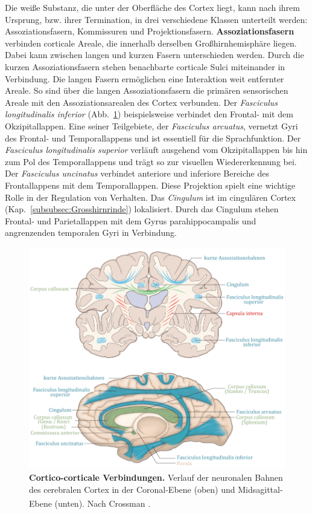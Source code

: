 \documentclass[12pt,a4paper,pdftex]{article}
\begin{document}
Die weiße Substanz, die unter der Oberfläche des Cortex liegt, kann nach ihrem Ursprung, bzw. ihrer Termination, in drei verschiedene Klassen unterteilt werden: Assoziationsfasern, Kommissuren und Projektionsfasern.
\textbf{Assoziationsfasern} verbinden corticale Areale, die innerhalb derselben Großhirnhemisphäre liegen. Dabei kann zwischen langen und kurzen Fasern unterschieden werden. Durch die kurzen Assoziationsfasern stehen benachbarte corticale Sulci miteinander in Verbindung. Die langen Fasern ermöglichen eine Interaktion weit entfernter Areale. So sind über die langen Assoziationsfasern die primären sensorischen Areale mit den Assoziationsarealen des Cortex verbunden. Der \textit{Fasciculus longitudinalis inferior} (Abb.~\ref{fig:cortico-cortical}) beispielsweise verbindet den Frontal- mit dem Okzipitallappen. Eine seiner Teilgebiete, der \textit{Fasciculus arcuatus}, vernetzt Gyri des Frontal- und Temporallappens und ist essentiell für die Sprachfunktion. Der \textit{Fasciculus longitudinalis superior} verläuft ausgehend vom Okzipitallappen bis hin zum Pol des Temporallappens und trägt so zur visuellen Wiedererkennung bei. Der \textit{Fasciculus uncinatus} verbindet anteriore und inferiore Bereiche des Frontallappens mit dem Temporallappen. Diese Projektion spielt eine wichtige Rolle in der Regulation von Verhalten. Das \textit{Cingulum} ist im cingulären Cortex (Kap.~\ref{subsubsec:Grosshirnrinde}) lokalisiert. Durch das Cingulum stehen Frontal- und Parietallappen mit dem Gyrus parahippocampalis und angrenzenden temporalen Gyri in Verbindung.

\begin{figure}[H]
    \centering
    \includegraphics[width=\textwidth]{pictures/Bilder_Jule/Andere/cortico-cortical_(crossm13).png}
    \caption[Cortico-corticale Verbindungen]{\textbf{Cortico-corticale Verbindungen.} Verlauf der neuronalen Bahnen des cerebralen Cortex in der Coronal-Ebene (oben) und Midsagittal-Ebene (unten). Nach Crossman \textsuperscript{\cite[13]{crossman2014neuroanatomy}}.}
    \label{fig:cortico-cortical}
\end{figure}{}
\end{document}
